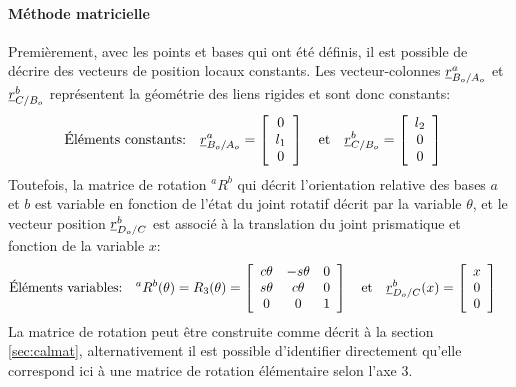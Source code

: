 \begin{example}
\paragraph{Méthode matricielle}

Premièrement, avec les points et bases qui ont été définis, il est possible de décrire des vecteurs de position locaux constants. Les vecteur-colonnes $\underline{r}_{B_o/A_o}^a$ et $\underline{r}_{C/B_o}^b$ représentent la géométrie des liens rigides et sont donc constants:
\begin{align}
\text{Éléments constants:}& \quad \underline{r}_{B_o/A_o}^a =  \left[ \begin{array}{c} 
0 \\ l_1 \\ 0
\end{array} \right]  \quad \text{et} \quad  \underline{r}_{C/B_o}^b =  \left[ \begin{array}{c} 
l_2 \\ 0 \\ 0
\end{array} \right] 
\end{align} 
Toutefois, la matrice de rotation ${}^aR^b$ qui décrit l'orientation relative des bases $a$ et $b$ est variable en fonction de l'état du joint rotatif décrit par la variable $\theta$, et le vecteur position $\underline{r}_{D_o/C}^b$ est associé à la translation du joint prismatique et fonction de la variable $x$:
\begin{align}
\text{Éléments variables:}& \quad {}^aR^b(\theta)= R_3(\theta) = \left[ \begin{array}{c c c}
	c\theta & -s\theta & 0 \\
	s\theta & c\theta & 0 \\
	0 & 0 & 1 
\end{array}  \right]  \quad \text{et} \quad  \underline{r}_{D_o/C}^b(x) =  \left[ \begin{array}{c} 
x \\ 0 \\ 0
\end{array} \right] 
\end{align} 
La matrice de rotation peut être construite comme décrit à la section \ref{sec:calmat}, alternativement il est possible d’identifier directement qu'elle correspond ici à une matrice de rotation élémentaire selon l'axe 3.


\end{example}
